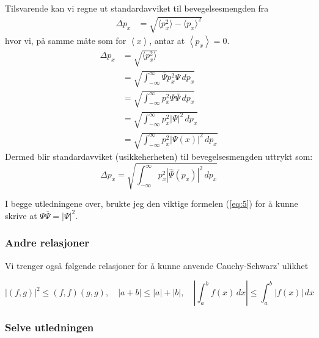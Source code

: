 \documentclass{article}
\newcommand{\inner}[1]{\ensuremath{\left\langle #1 \right\rangle}}
\begin{document}
Tilsvarende kan vi regne ut standardavviket til bevegelsesmengden fra
\begin{align*}
    \Delta p_x &= \sqrt{\langle p_x^2\rangle - \langle p_x\rangle^2} 
\end{align*}
hvor vi, på samme måte som for $\inner{x}$, antar at $\inner{p_x} = 0$. 
\begin{align*}
    \Delta p_x &= \sqrt{\langle p_x^2 \rangle} \\
    &= \sqrt{\int_{-\infty}^{\infty}\overline{\Psi}p_x^2\Psi \, dp_x} \\
    &= \sqrt{\int_{-\infty}^{\infty}p_x^2\Psi \overline{\Psi} \, dp_x} \\
    &= \sqrt{\int_{-\infty}^{\infty}p_x^2 |\Psi|^2\, dp_x} \\
    &= \sqrt{\int_{-\infty}^{\infty}p_x^2 | \Psi(x) |^2 \, dp_x}
\end{align*}
Dermed blir standardavviket (usikkeherheten) til bevegelsesmengden uttrykt som:
\begin{equation}
    \Delta p_x = \sqrt{\int_{-\infty}^{\infty}p_x^2|\widehat{\Psi}(p_x)|^2\, dp_x} \label{eq:7}
\end{equation}

I begge utledningene over, brukte jeg den viktige formelen (\ref{eq:5}) for å kunne skrive at $\Psi\overline{\Psi} = |\Psi|^2$.

\vspace{0.2in}
\subsubsection{Andre relasjoner}
Vi trenger også følgende relasjoner for å kunne anvende Cauchy-Schwarz' ulikhet

\begin{equation}
    |(f,g)|^2 \le (f,f) (g,g), \quad |a+b| \le |a| + |b|, \quad \left|\int_a^bf(x)\,dx\right| \le \int_a^b|f(x)|\,dx \label{eq:8}
\end{equation}



\subsubsection{Selve utledningen}
\end{document}
